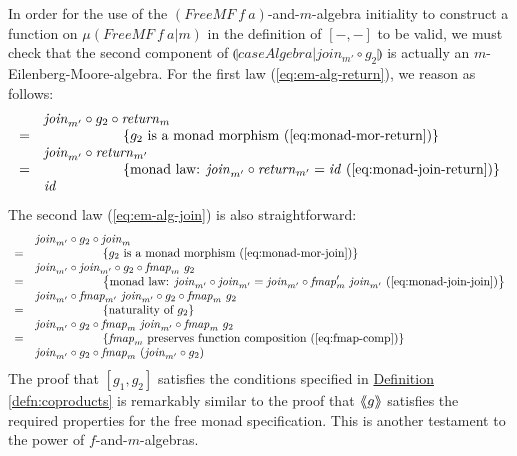 \documentclass{jfp1}
\newcommand{\eFold}[2]{\llparenthesis #1|#2 \rrparenthesis}
\newcommand{\fmext}[1]{\langle\kern-0.25em\langle #1 \rangle\kern-0.25em\rangle}
\newcommand{\eqAnnotation}[1]{\hspace{2cm}\left\{\textrm{#1}\right\}}
\newcommand{\defref}[1]{\hyperref[#1]{Definition \ref*{#1}}}
\begin{document}
In order for the use of the $(\mathit{FreeMF}~f~a)$-and-$m$-algebra
initiality to construct a function on $\mu(\mathit{FreeMF}~f~a|m)$ in
the definition of $[-,-]$ to be valid, we must check that the second
component of $\eFold{\mathit{caseAlgebra}}{\mathit{join_{m'}} \circ
  g_2}$ is actually an $m$-Eilenberg-Moore-algebra. For the first law
(\autoref{eq:em-alg-return}), we reason as follows:
\begin{displaymath}
  \begin{array}{cl}
    & \mathit{join}_{m'} \circ g_2 \circ \mathit{return}_m \\
    =&\eqAnnotation{$g_2$ is a monad morphism (\autoref{eq:monad-mor-return})} \\
    & \mathit{join}_{m'} \circ \mathit{return}_{m'} \\
    =&\eqAnnotation{monad law: $\mathit{join}_{m'} \circ \mathit{return}_{m'} = \mathit{id}$ (\autoref{eq:monad-join-return})} \\
    & \mathit{id}
  \end{array}
\end{displaymath}
The second law (\autoref{eq:em-alg-join}) is also straightforward:
\begin{displaymath}
  \begin{array}{cl}
    & \mathit{join}_{m'} \circ g_2 \circ \mathit{join}_m \\
    =&\eqAnnotation{$g_2$ is a monad morphism (\autoref{eq:monad-mor-join})} \\
    & \mathit{join}_{m'} \circ \mathit{join}_{m'} \circ g_2 \circ \mathit{fmap}_m~g_2 \\
    =&\eqAnnotation{monad law: $\mathit{join}_{m'} \circ \mathit{join}_{m'} = \mathit{join}_{m'} \circ \mathit{fmap}_m'~\mathit{join}_{m'}$ (\autoref{eq:monad-join-join})} \\
    & \mathit{join}_{m'} \circ \mathit{fmap}_{m'}~\mathit{join}_{m'} \circ g_2 \circ \mathit{fmap}_m~g_2 \\
    =&\eqAnnotation{naturality of $g_2$} \\
    & \mathit{join}_{m'} \circ g_2 \circ \mathit{fmap}_{m}~\mathit{join}_{m'} \circ \mathit{fmap}_m~g_2 \\
    =&\eqAnnotation{$\mathit{fmap}_m$ preserves function composition (\autoref{eq:fmap-comp})} \\
    & \mathit{join}_{m'} \circ g_2 \circ \mathit{fmap}_{m}~(\mathit{join}_{m'} \circ g_2)
  \end{array}
\end{displaymath}
The proof that $[g_1,g_2]$ satisfies the conditions specified in
\defref{defn:coproducts} is remarkably similar to the proof that
$\fmext{g}$ satisfies the required properties for the free monad
specification. This is another testament to the power of
$f$-and-$m$-algebras.
\end{document}
